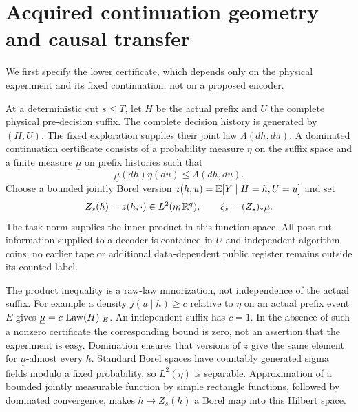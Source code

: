 \section{Acquired continuation geometry and causal transfer}\label{sec:transfer}
We first specify the lower certificate, which depends only on the physical experiment and its fixed continuation, not on a proposed encoder.

\begin{definition}\label{def:cut}
At a deterministic cut $s\le T$, let $H$ be the actual prefix and $U$ the complete physical pre-decision suffix. The complete decision history is generated by $(H,U)$. The fixed exploration supplies their joint law $\Lambda(dh,du)$. A dominated continuation certificate consists of a probability measure $\eta$ on the suffix space and a finite measure $\underline\mu$ on prefix histories such that
\begin{equation}\label{eq:domination}
 \underline\mu(dh)\eta(du)\le\Lambda(dh,du).
\end{equation}
Choose a bounded jointly Borel version $z(h,u)=\mathbb E[Y\mid H=h,U=u]$ and set
\[
 Z_s(h)=z(h,\cdot)\in L^2(\eta;\mathbb R^q),\qquad
 \xi_s=(Z_s)_*\underline\mu.
\]
The task norm supplies the inner product in this function space. All post-cut information supplied to a decoder is contained in $U$ and independent algorithm coins; no earlier tape or additional data-dependent public register remains outside its counted label.
\end{definition}

The product inequality is a raw-law minorization, not independence of the actual suffix. For example a density $j(u\mid h)\ge c$ relative to $\eta$ on an actual prefix event $E$ gives $\underline\mu=c\,\operatorname{Law}(H)|_E$. An independent suffix has $c=1$. In the absence of such a nonzero certificate the corresponding bound is zero, not an assertion that the experiment is easy. Domination ensures that versions of $z$ give the same element for $\underline\mu$-almost every $h$. Standard Borel spaces have countably generated sigma fields modulo a fixed probability, so $L^2(\eta)$ is separable. Approximation of a bounded jointly measurable function by simple rectangle functions, followed by dominated convergence, makes $h\mapsto Z_s(h)$ a Borel map into this Hilbert space.

